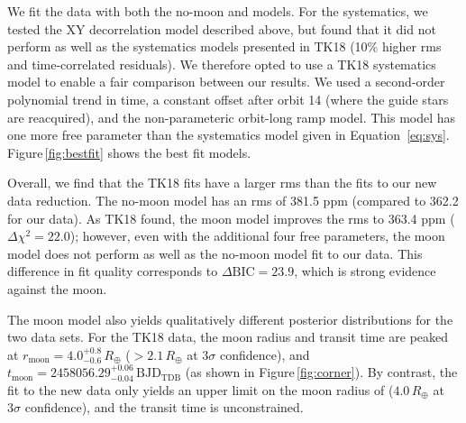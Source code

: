 \documentclass[twocolumn]{aastex62}
\begin{document}
We fit the data with both the no-moon and models.  For the systematics, we tested the XY decorrelation model described above, but found that it did not perform as well as the systematics models presented in TK18 (10\% higher rms and time-correlated residuals).  We therefore opted to use a TK18 systematics model to enable a fair comparison between our results. We used a second-order polynomial trend in time, a constant offset after orbit 14 (where the guide stars are reacquired), and the non-parameteric orbit-long ramp model. This model has one more free parameter than the systematics model given in Equation~\ref{eq:sys}. Figure\,\ref{fig:bestfit} shows the best fit models.

Overall, we find that the TK18 fits have a larger rms than the fits to our new data reduction. The no-moon model has an rms of 381.5 ppm (compared to 362.2 for our data). As TK18 found, the moon model improves the rms to 363.4 ppm ($\Delta\chi^2 = 22.0$); however, even with the additional four free parameters, the moon model does not perform as well as the no-moon model fit to our data.  This difference in fit quality corresponds to $\Delta\mathrm{BIC} = 23.9$, which is strong evidence against the moon.  

The moon model also yields qualitatively different posterior distributions for the two data sets.  For the TK18 data, the moon radius and transit time are peaked at $r_\mathrm{moon} = 4.0^{+0.8}_{-0.6}\,R_\oplus$ ($>2.1\,R_\oplus$ at $3\sigma$ confidence), and $t_\mathrm{moon} =  2458056.29^{+0.06}_{-0.04}\,\mathrm{BJD_{TDB}}$ (as shown in Figure\,\ref{fig:corner}). By contrast, the fit to the new data only yields an upper limit on the moon radius of ($4.0\,R_\oplus$ at $3\sigma$ confidence), and the transit time is unconstrained.




\end{document}
